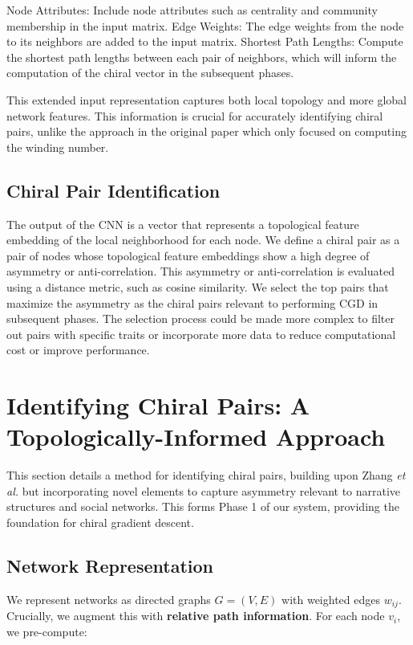 \documentclass[12pt, a4paper]{article}
\begin{document}
Node Attributes:  Include node attributes such as centrality and community membership in the input matrix.
Edge Weights:  The edge weights from the node to its neighbors are added to the input matrix.
Shortest Path Lengths:  Compute the shortest path lengths between each pair of neighbors, which will inform the computation of the chiral vector in the subsequent phases.

This extended input representation captures both local topology and more global network features. This information is crucial for accurately identifying chiral pairs, unlike the approach in the original paper which only focused on computing the winding number.

\subsection{Chiral Pair Identification}

The output of the CNN is a vector that represents a topological feature embedding of the local neighborhood for each node.  We define a chiral pair as a pair of nodes whose topological feature embeddings show a high degree of asymmetry or anti-correlation. This asymmetry or anti-correlation is evaluated using a distance metric, such as cosine similarity. We select the top pairs that maximize the asymmetry as the chiral pairs relevant to performing CGD in subsequent phases.  The selection process could be made more complex to filter out pairs with specific traits or incorporate more data to reduce computational cost or improve performance.

\section{Identifying Chiral Pairs: A Topologically-Informed Approach}

This section details a method for identifying chiral pairs, building upon Zhang \textit{et al.} \cite{zhang2018machine} but incorporating novel elements to capture asymmetry relevant to narrative structures and social networks. This forms Phase 1 of our system, providing the foundation for chiral gradient descent.

\subsection{Network Representation}

We represent networks as directed graphs $G = (V, E)$ with weighted edges $w_{ij}$. Crucially, we augment this with \textbf{relative path information}. For each node $v_i$, we pre-compute:
\end{document}

